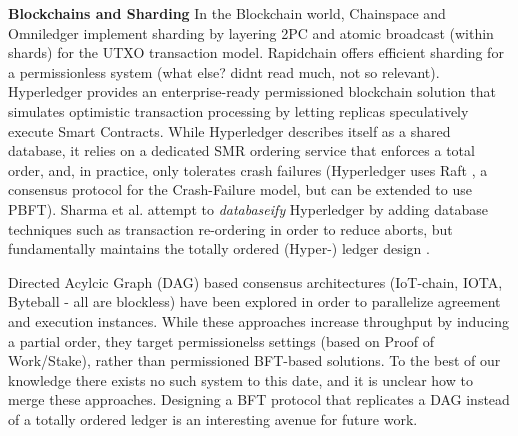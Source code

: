 \textbf{Blockchains and Sharding}
In the Blockchain world, Chainspace \cite{al2017chainspace} and Omniledger \cite{kokoris2018omniledger} implement sharding by layering 2PC and atomic broadcast (within shards) for the UTXO transaction model. Rapidchain \cite{zamani2018rapidchain} offers efficient sharding for a permissionless system (what else? didnt read much, not so relevant). Hyperledger provides an enterprise-ready permissioned blockchain solution that simulates optimistic transaction processing by letting replicas speculatively execute Smart Contracts. While Hyperledger \cite{Hyperledger} describes itself as a shared database, it relies on a dedicated SMR ordering service that enforces a total order, and, in practice, only tolerates crash failures (Hyperledger uses Raft \cite{ongaro2014search}, a consensus protocol for the Crash-Failure model,  but can be extended to use PBFT). Sharma et al. attempt to \textit{databaseify} Hyperledger by adding database techniques such as transaction re-ordering in order to reduce aborts, but fundamentally maintains the totally ordered (Hyper-) ledger design \cite{sharma2018databasify}.  

Directed Acylcic Graph (DAG) based consensus architectures \cite{pervez2018comparative}(IoT-chain, IOTA, Byteball - all are blockless) have been explored  in order to parallelize agreement and execution instances. While these approaches increase throughput by inducing a partial order, they target permissionelss settings (based on Proof of Work/Stake), rather than permissioned BFT-based solutions. To the best of our knowledge there exists no such system to this date, and it is unclear how to merge these approaches. Designing a BFT protocol that replicates a DAG instead of a totally ordered ledger is an interesting avenue for future work.







\fi